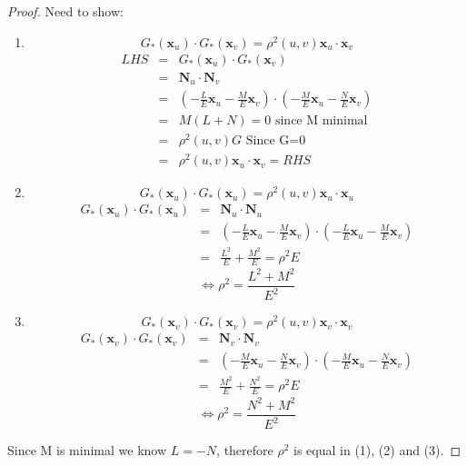 \begin{proof}

Need to show:
\begin{enumerate}
\item \begin{displaymath}
G_*(\mathbf x_u) \cdot G_*(\mathbf x_v) = \rho^2(u,v)\mathbf x_u \cdot \mathbf x_v
\end{displaymath}
\begin{eqnarray}
\nonumber
LHS &=& G_*(\mathbf x_u) \cdot G_*(\mathbf x_v) \\
\nonumber
&=& \mathbf N_u \cdot \mathbf N_v \\
\nonumber
&=& \left(-\frac{L}{E} \mathbf x_u - \frac{M}{E} \mathbf x_v \right) \cdot \left(-\frac{M}{E} \mathbf x_u - \frac{N}{E} \mathbf x_v \right) \\
\nonumber
&=& M\left(L+N\right) = 0 \mbox{\ \ \ \ \ since M minimal} \\
\nonumber
&=& \rho^2(u,v) G \mbox{\ \ \ \ \ Since G=0} \\
\nonumber
&=& \rho^2(u,v)\mathbf x_u \cdot \mathbf x_v = RHS
\end{eqnarray}   

\item \begin{displaymath}
G_*(\mathbf x_u) \cdot G_*(\mathbf x_u) = \rho^2(u,v)\mathbf x_u \cdot \mathbf x_u
\end{displaymath}
\begin{eqnarray}
\nonumber
G_*(\mathbf x_u) \cdot G_*(\mathbf x_u)&=& \mathbf N_u \cdot \mathbf N_u \\
\nonumber
&=& \left(-\frac{L}{E} \mathbf x_u - \frac{M}{E} \mathbf x_v \right) \cdot \left(-\frac{L}{E} \mathbf x_u - \frac{M}{E} \mathbf x_v \right) \\
\nonumber
&=& \frac{L^2}{E} + \frac{M^2}{E} = \rho^2 E
\end{eqnarray} 
\begin{displaymath}
\Leftrightarrow \rho^2 = \frac{L^2+M^2}{E^2}
\end{displaymath}

\item \begin{displaymath}
G_*(\mathbf x_v) \cdot G_*(\mathbf x_v) = \rho^2(u,v)\mathbf x_v \cdot \mathbf x_v
\end{displaymath}
\begin{eqnarray}
\nonumber
G_*(\mathbf x_v) \cdot G_*(\mathbf x_v) &=& \mathbf N_v \cdot \mathbf N_v \\
\nonumber
&=& \left(-\frac{M}{E} \mathbf x_u - \frac{N}{E} \mathbf x_v \right) \cdot \left(-\frac{M}{E} \mathbf x_u - \frac{N}{E} \mathbf x_v \right) \\
\nonumber
&=& \frac{M^2}{E} + \frac{N^2}{E} = \rho^2 E
\end{eqnarray} 
\begin{displaymath}
\Leftrightarrow \rho^2 = \frac{N^2+M^2}{E^2}
\end{displaymath}

\end{enumerate}

Since M is minimal we know $L = -N$, therefore $\rho^2$ is equal in (1), (2) and (3).
\end{proof}

